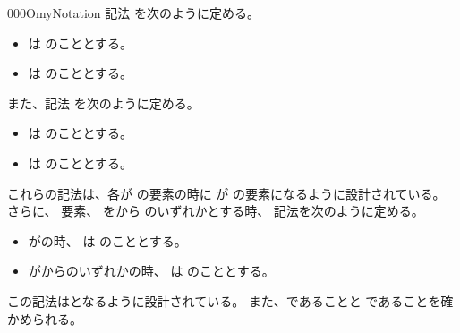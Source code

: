 \documentclass[index]{subfiles}
\begin{document}
\begin{myBlock}{000O}{myNotation}
  記法
  を次のように定める。
  \begin{itemize}
  \item \myInlineMath{\myRecordType{}}は
    \myInlineMath{\myUnitType}のこととする。
  \item {}は
    のこととする。
  \end{itemize}
  また、記法
  を次のように定める。
  \begin{itemize}
  \item \myInlineMath{\myRecordElem{}}は
    \myInlineMath{\myUnitElem}のこととする。
  \item {}は
    のこととする。
  \end{itemize}
  これらの記法は、各が
  の要素の時に
  が
  の要素になるように設計されている。
  さらに、
  要素、
  をから
  のいずれかとする時、
  記法を次のように定める。
  \begin{itemize}
  \item {}がの時、
    は
    のこととする。
  \item {}がからのいずれかの時、
    は
    のこととする。
  \end{itemize}
  この記法はとなるように設計されている。
  また、であることと
  であることを確かめられる。
\end{myBlock}
\end{document}
